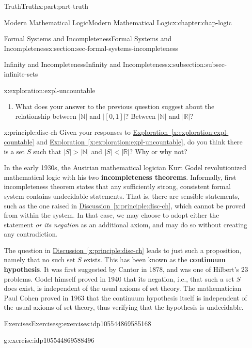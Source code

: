 \documentclass[oneside,10pt,]{book}
\newcommand{\xreffont}{\relax}
\newcommand{\terminology}[1]{\textbf{#1}}
\numberwithin{equation}{section}
\newcommand{\lt}{<}
\newcommand{\gt}{>}
\begin{document}
\begin{partptx}{Truth}{}{Truth}{}{}{x:part:part-truth}
\begin{chapterptx}{Modern Mathematical Logic}{}{Modern Mathematical Logic}{}{}{x:chapter:chap-logic}
\begin{sectionptx}{Formal Systems and Incompleteness}{}{Formal Systems and Incompleteness}{}{}{x:section:sec-formal-systems-incompleteness}
\begin{subsectionptx}{Infinity and Incompleteness}{}{Infinity and Incompleteness}{}{}{x:subsection:subsec-infinite-sets}
\begin{exploration}{}{x:exploration:expl-uncountable}
\begin{enumerate}
\item{}What does your answer to the previous question suggest about the relationship between \(|\mathbb{N}|\) and \(|[0,1]|\)? Between \(|\mathbb{N}|\) and \(|\mathbb{R}|\)?%
\end{enumerate}
\end{exploration}%
\begin{principle}{}{}{x:principle:disc-ch}%
Given your responses to \hyperref[x:exploration:expl-countable]{Exploration~{\xreffont\ref{x:exploration:expl-countable}}} and \hyperref[x:exploration:expl-uncountable]{Exploration~{\xreffont\ref{x:exploration:expl-uncountable}}}, do you think there is a set \(S\) such that \(|S| \gt |\mathbb{N}|\) and \(|S| \lt |\mathbb{R}|\)? Why or why not?%
\end{principle}
 In the early 1930s, the Austrian mathematical logician Kurt Godel revolutionized mathematical logic with his two \terminology{incompleteness theorems}. Informally, first incompleteness theorem states that any sufficiently strong, consistent formal system contains undecidable statements. That is, there are sensible statements, such as the one raised in \hyperref[x:principle:disc-ch]{Discussion~{\xreffont\ref{x:principle:disc-ch}}}, which cannot be proved from within the system. In that case, we may choose to adopt either the statement \emph{or its negation} as an additional axiom, and may do so without creating any contradiction.%
\par
The question in \hyperref[x:principle:disc-ch]{Discussion~{\xreffont\ref{x:principle:disc-ch}}} leads to just such a proposition, namely that no such set \(S\) exists. This has been known as the \terminology{continuum hypothesis}. It was first suggested by Cantor in 1878, and was one of Hilbert's 23 problems. Godel himself proved in 1940 that its negation, i.e., that such a set \(S\) does exist, is independent of the usual axioms of set theory. The mathematician Paul Cohen proved in 1963 that the continuum hypothesis itself is independent of the usual axioms of set theory, thus verifying that the hypothesis is undecidable.%
\end{subsectionptx}
%
%
\typeout{************************************************}
\typeout{************************************************}
%
\begin{exercises-subsection}{Exercises}{}{Exercises}{}{}{g:exercises:idp105544869585168}
\begin{divisionexercise}{1}{}{}{g:exercise:idp105544869588496}%

\end{divisionexercise}
\end{exercises-subsection}
\end{sectionptx}
\end{chapterptx}
\end{partptx}
\end{document}
